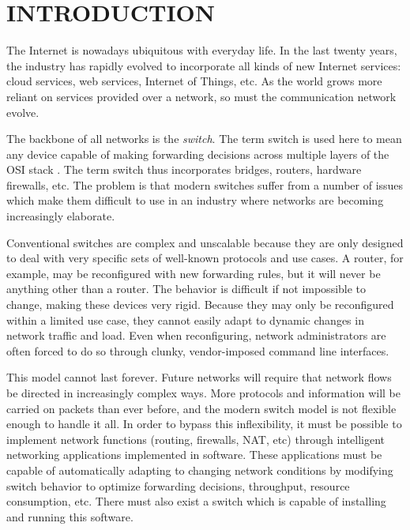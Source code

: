\chapter{INTRODUCTION} \label{ch:intro}

%
%


The Internet is nowadays ubiquitous with everyday life. In the last twenty
years,
the industry has rapidly evolved to incorporate all kinds of new Internet
services:
cloud services, web services, Internet of Things, etc. As the world grows
more reliant on services provided over a network, so must the communication network evolve.

The backbone of all networks is the \emph{switch}. The term switch is used here to mean any device capable of making forwarding decisions across multiple layers of the OSI stack \cite{osi_model}. The term switch thus incorporates bridges, routers, hardware firewalls, etc.
The problem is that modern switches suffer from a number of issues which make them difficult to use in an industry where networks are becoming increasingly elaborate.

Conventional switches are complex and unscalable because they are only designed to deal with very specific sets of well-known protocols and use cases. A router, for example, may be reconfigured with new forwarding rules, but it will never be anything other than a router. The behavior is difficult if not impossible to change, making these devices very rigid.
Because they may only be reconfigured within a limited use case, they cannot easily adapt to dynamic changes in network traffic and load.
Even when reconfiguring, network administrators are often forced to do so through clunky, vendor-imposed command line interfaces. 

This model cannot last forever. Future networks will require that network flows be directed in increasingly complex ways. More protocols and information will be carried on packets than ever before, and the modern switch model is not flexible enough to handle it all.
In order to bypass this inflexibility, it must be possible to implement network functions (routing, firewalls, NAT, etc) through intelligent networking applications implemented in software.
These applications must be capable of automatically adapting to changing network conditions by modifying switch behavior to optimize forwarding decisions, throughput, resource consumption, etc.
There must also exist a switch which is capable of installing and running this software.

